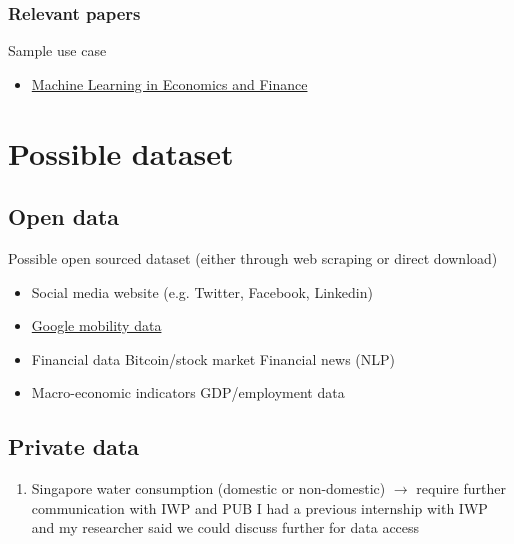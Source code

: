 \documentclass[11pt, oneside]{article}   	%
\begin{document}
    \subsubsection{Relevant papers}
    Sample use case
    \begin{itemize}
        \item \href{https://link-springer-com.libproxy1.nus.edu.sg/article/10.1007/s10614-021-10094-w}{Machine Learning
            in Economics and Finance}
    \end{itemize}

\section{Possible dataset}

    \subsection{Open data}

    Possible open sourced dataset (either through web scraping or direct download)

    \begin{itemize}
        \item Social media website (e.g. Twitter, Facebook, Linkedin)
        \item \href{https://www.google.com/covid19/mobility/}{Google mobility data}
        \item Financial data
            \subitem Bitcoin/stock market
            \subitem Financial news (NLP)
        \item Macro-economic indicators
            \subitem GDP/employment data
    \end{itemize}

    \subsection{Private data}

    \begin{enumerate}
        \item Singapore water consumption (domestic or non-domestic) $\rightarrow$ require further communication with
            IWP and PUB
            \subitem I had a previous internship with IWP and my researcher said we could discuss further for data
            access
    \end{enumerate}
\end{document}
